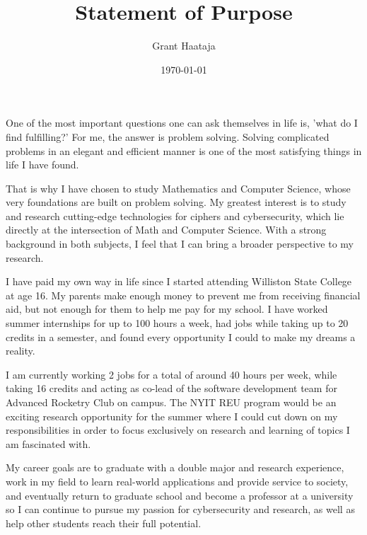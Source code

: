 \documentclass[11pt,final,twoside]{article} %
\title{Statement of Purpose}
\author{Grant Haataja}
\date{\today}
\begin{document}
	\maketitle

One of the most important questions one can ask themselves in life is, 'what do I find fulfilling?' For me, the answer is problem solving. Solving complicated problems in an elegant and efficient manner is one of the most satisfying things in life I have found. 
 
That is why I have chosen to study Mathematics and Computer Science, whose very foundations are built on problem solving. My greatest interest is to study and research cutting-edge technologies for ciphers and cybersecurity, which lie directly at the intersection of Math and Computer Science. With a strong background in both subjects, I feel that I can bring a broader perspective to my research.

I have paid my own way in life since I started attending Williston State College at age 16. My parents make enough money to prevent me from receiving financial aid, but not enough for them to help me pay for my school. I have worked summer internships for up to 100 hours a week, had jobs while taking up to 20 credits in a semester, and found every opportunity I could to make my dreams a reality. 

I am currently working 2 jobs for a total of around 40 hours per week, while taking 16 credits and acting as co-lead of the software development team for Advanced Rocketry Club on campus. The NYIT REU program would be an exciting research opportunity for the summer where I could cut down on my responsibilities in order to focus exclusively on research and learning of topics I am fascinated with. 

My career goals are to graduate with a double major and research experience, work in my field to learn real-world applications and provide service to society, and eventually return to graduate school and become a professor at a university so I can continue to pursue my passion for cybersecurity and research, as well as help other students reach their full potential.
\end{document}
